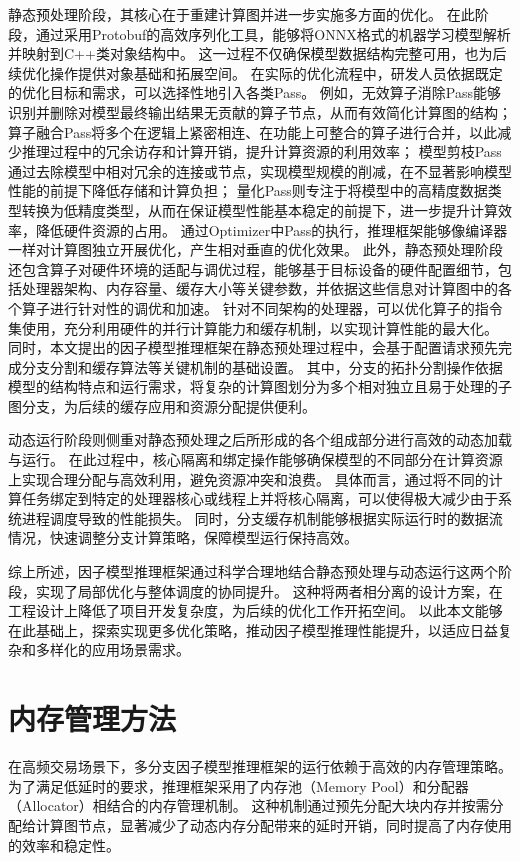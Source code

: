 静态预处理阶段，其核心在于重建计算图并进一步实施多方面的优化。
在此阶段，通过采用Protobuf的高效序列化工具，能够将ONNX格式的机器学习模型解析并映射到C++类对象结构中。
这一过程不仅确保模型数据结构完整可用，也为后续优化操作提供对象基础和拓展空间。
在实际的优化流程中，研发人员依据既定的优化目标和需求，可以选择性地引入各类Pass。
例如，无效算子消除Pass能够识别并删除对模型最终输出结果无贡献的算子节点，从而有效简化计算图的结构；
算子融合Pass将多个在逻辑上紧密相连、在功能上可整合的算子进行合并，以此减少推理过程中的冗余访存和计算开销，提升计算资源的利用效率；
模型剪枝Pass通过去除模型中相对冗余的连接或节点，实现模型规模的削减，在不显著影响模型性能的前提下降低存储和计算负担；
量化Pass则专注于将模型中的高精度数据类型转换为低精度类型，从而在保证模型性能基本稳定的前提下，进一步提升计算效率，降低硬件资源的占用。
通过Optimizer中Pass的执行，推理框架能够像编译器一样对计算图独立开展优化，产生相对垂直的优化效果。
此外，静态预处理阶段还包含算子对硬件环境的适配与调优过程，能够基于目标设备的硬件配置细节，包括处理器架构、内存容量、缓存大小等关键参数，并依据这些信息对计算图中的各个算子进行针对性的调优和加速。
针对不同架构的处理器，可以优化算子的指令集使用，充分利用硬件的并行计算能力和缓存机制，以实现计算性能的最大化。
同时，本文提出的因子模型推理框架在静态预处理过程中，会基于配置请求预先完成分支分割和缓存算法等关键机制的基础设置。
其中，分支的拓扑分割操作依据模型的结构特点和运行需求，将复杂的计算图划分为多个相对独立且易于处理的子图分支，为后续的缓存应用和资源分配提供便利。

动态运行阶段则侧重对静态预处理之后所形成的各个组成部分进行高效的动态加载与运行。
在此过程中，核心隔离和绑定操作能够确保模型的不同部分在计算资源上实现合理分配与高效利用，避免资源冲突和浪费。
具体而言，通过将不同的计算任务绑定到特定的处理器核心或线程上并将核心隔离，可以使得极大减少由于系统进程调度导致的性能损失。
同时，分支缓存机制能够根据实际运行时的数据流情况，快速调整分支计算策略，保障模型运行保持高效。

综上所述，因子模型推理框架通过科学合理地结合静态预处理与动态运行这两个阶段，实现了局部优化与整体调度的协同提升。
这种将两者相分离的设计方案，在工程设计上降低了项目开发复杂度，为后续的优化工作开拓空间。
以此本文能够在此基础上，探索实现更多优化策略，推动因子模型推理性能提升，以适应日益复杂和多样化的应用场景需求。

\section{内存管理方法}

在高频交易场景下，多分支因子模型推理框架的运行依赖于高效的内存管理策略。
为了满足低延时的要求，推理框架采用了内存池（Memory Pool）和分配器（Allocator）相结合的内存管理机制。
这种机制通过预先分配大块内存并按需分配给计算图节点，显著减少了动态内存分配带来的延时开销，同时提高了内存使用的效率和稳定性。


